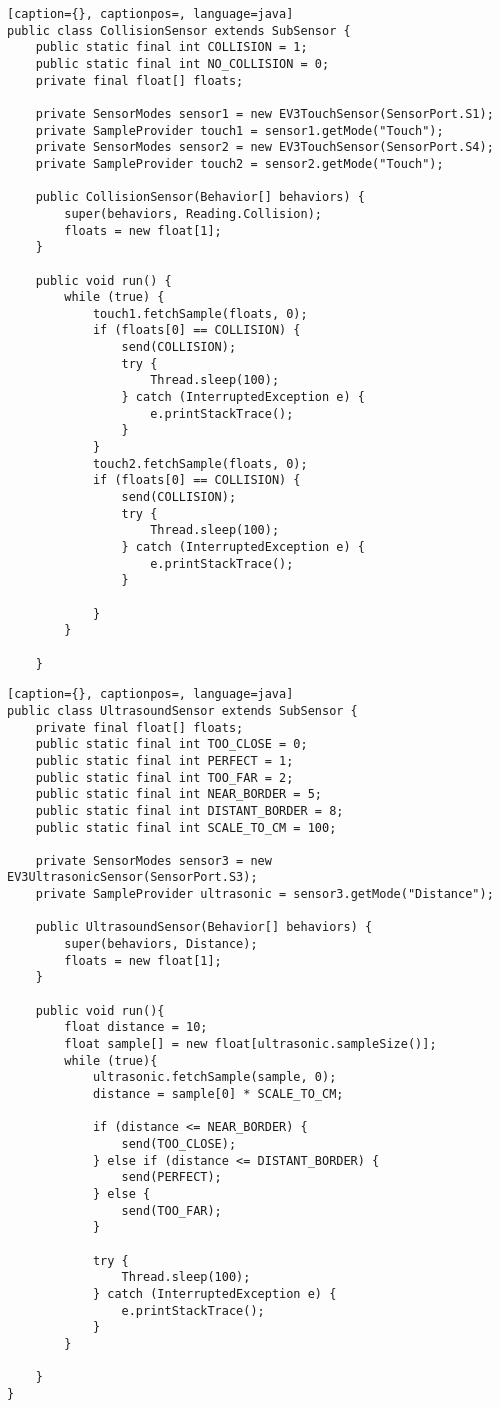 \begin{lstlisting}[caption={}, captionpos=, language=java]
public class CollisionSensor extends SubSensor {
    public static final int COLLISION = 1;
    public static final int NO_COLLISION = 0;
    private final float[] floats;

    private SensorModes sensor1 = new EV3TouchSensor(SensorPort.S1);
    private SampleProvider touch1 = sensor1.getMode("Touch");
    private SensorModes sensor2 = new EV3TouchSensor(SensorPort.S4);
    private SampleProvider touch2 = sensor2.getMode("Touch");

    public CollisionSensor(Behavior[] behaviors) {
        super(behaviors, Reading.Collision);
        floats = new float[1];
    }

    public void run() {
        while (true) {
            touch1.fetchSample(floats, 0);
            if (floats[0] == COLLISION) {
                send(COLLISION);
                try {
                    Thread.sleep(100);
                } catch (InterruptedException e) {
                    e.printStackTrace();
                }
            }
            touch2.fetchSample(floats, 0);
            if (floats[0] == COLLISION) {
                send(COLLISION);
                try {
                    Thread.sleep(100);
                } catch (InterruptedException e) {
                    e.printStackTrace();
                }

            }
        }

    }
\end{lstlisting}

\begin{lstlisting}[caption={}, captionpos=, language=java]
public class UltrasoundSensor extends SubSensor {
    private final float[] floats;
    public static final int TOO_CLOSE = 0;
    public static final int PERFECT = 1;
    public static final int TOO_FAR = 2;
    public static final int NEAR_BORDER = 5;
    public static final int DISTANT_BORDER = 8;
    public static final int SCALE_TO_CM = 100;

    private SensorModes sensor3 = new EV3UltrasonicSensor(SensorPort.S3);
    private SampleProvider ultrasonic = sensor3.getMode("Distance");

    public UltrasoundSensor(Behavior[] behaviors) {
        super(behaviors, Distance);
        floats = new float[1];
    }

    public void run(){
        float distance = 10;
        float sample[] = new float[ultrasonic.sampleSize()];
        while (true){
            ultrasonic.fetchSample(sample, 0);
            distance = sample[0] * SCALE_TO_CM;

            if (distance <= NEAR_BORDER) {
                send(TOO_CLOSE);
            } else if (distance <= DISTANT_BORDER) {
                send(PERFECT);
            } else {
                send(TOO_FAR);
            }

            try {
                Thread.sleep(100);
            } catch (InterruptedException e) {
                e.printStackTrace();
            }
        }

    }
}
\end{lstlisting}
